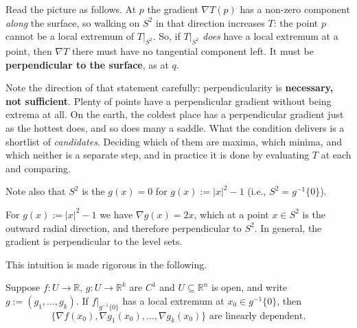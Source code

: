 Read the picture as follows. At $p$ the gradient $\nabla T(p)$ has a non-zero component
\emph{along} the surface, so walking on $S^2$ in that direction increases $T$: the point $p$
cannot be a local extremum of $T|_{S^2}$. So, if $T|_{S^2}$ \emph{does} have a local extremum at a
point, then $\nabla T$ there must have no tangential component left. It must be
\textbf{perpendicular to the surface}, as at $q$.

Note the direction of that statement carefully: perpendicularity is \textbf{necessary, not
sufficient}. Plenty of points have a perpendicular gradient without being extrema at all. On the
earth, the coldest place has a perpendicular gradient just as the hottest does, and so does many
a saddle. What the condition delivers is a shortlist of \emph{candidates}. Deciding which of them
are maxima, which minima, and which neither is a separate step, and in practice it is done by
evaluating $T$ at each and comparing.

Note also that $S^2$ is the   $g(x) = 0$ for
$g(x) := |x|^2 - 1$ (i.e., $S^2 = g^{-1}\{0\}$).

\begin{remark}
For $g(x) := |x|^2-1$ we have $\nabla g(x) = 2x$, which at a point $x \in S^2$ is the outward
radial direction, and therefore perpendicular to $S^2$. In general, the gradient is perpendicular
to the level sets.
\end{remark}


This intuition is made rigorous in the following.

\begin{proposition}
\label{prop:constrained_optimization}
Suppose $f : U \to \mathbb{R}$, $g : U \to \mathbb{R}^k$ are $C^1$ and $U \subseteq \mathbb{R}^n$
is open, and write $g := (g_1,\dots,g_k)$. If $f|_{g^{-1}\{0\}}$ has a local extremum at
$x_0 \in g^{-1}\{0\}$, then
\[\{\nabla f(x_0), \nabla g_1(x_0), \dots, \nabla g_k(x_0)\} \text{ are linearly dependent.}\]
\end{proposition}

